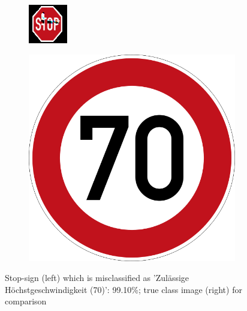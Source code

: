 \begin{figure}[h]
\centering
\begin{subfigure}{.19\linewidth}
  \centering
  \includegraphics[width=0.7\linewidth]{imgs/stopp_to_7}
\end{subfigure}
\begin{subfigure}{.19\linewidth}
  \centering
  \includegraphics[width=0.7\linewidth]{imgs/7_real}
\end{subfigure}
\caption{Stop-sign (left) which is misclassified as 'Zulässige Höchstgeschwindigkeit (70)': 99.10\%; true class image (right) for comparison}
\label{fig:stopsign}
\end{figure}

